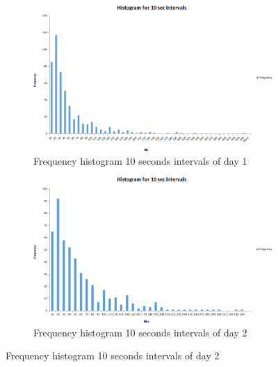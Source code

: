 \documentclass{article}
\begin{document}
\begin{figure}[H]
    \begin{subfigure}{0.5\textwidth}
        \includegraphics[width=\linewidth]{day1-hist-10sec.png}
        \caption{Frequency histogram 10 seconds intervals of day 1}
    \end{subfigure}
    \begin{subfigure} {0.5\textwidth}
        \includegraphics[width=\linewidth]{day2-hist-10sec.png}
        \caption{Frequency histogram 10 seconds intervals of day 2}
    \end{subfigure}
\end{figure}
\end{document}
